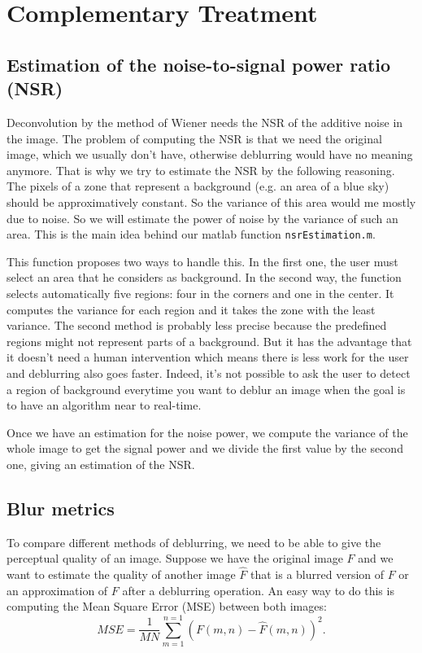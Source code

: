 \section{Complementary Treatment}
\label{sec:CompTr}
\subsection{Estimation of the noise-to-signal power ratio (NSR)}
\label{subsec:NSREstimation}
Deconvolution by the method of Wiener needs the NSR of the additive noise in the image. The problem of computing the NSR is that we need the original image, which we usually don't have, otherwise deblurring would have no meaning anymore. That is why we try to estimate the NSR by the following reasoning. The pixels of a zone that represent a background (e.g. an area of a blue sky) should be approximatively constant. So the variance of this area would me mostly due to noise. So we will estimate the power of noise by the variance of such an area. This is the main idea behind our matlab function \texttt{nsrEstimation.m}.

This function proposes two ways to handle this. In the first one, the user must select an area that he considers as background. In the second way, the function selects automatically five regions: four in the corners and one in the center. It computes the variance for each region and it takes the zone with the least variance. The second method is probably less precise because the predefined regions might not represent parts of a background. But it has the advantage that it doesn't need a human intervention which means there is less work for the user and deblurring also goes faster. Indeed, it's not possible to ask the user to detect a region of background everytime you want to deblur an image when the goal is to have an algorithm near to real-time.

Once we have an estimation for the noise power, we compute the variance of the whole image to get the signal power and we divide the first value by the second one, giving an estimation of the NSR.


\subsection{Blur metrics}

To compare different methods of deblurring, we need to be able to give the perceptual quality of an image. Suppose we have the original image $F$ and we want to estimate the quality of another image $\hat{F}$ that is a blurred version of $F$ or an approximation of $F$ after a deblurring operation. An easy way to do this is computing the Mean Square Error (MSE) between both images:
\begin{equation}
MSE=\frac{1}{MN} \sum\limits_{m=1}^{n=1}\left(F(m,n)-\hat{F}(m,n)\right)^2.
\end{equation}


